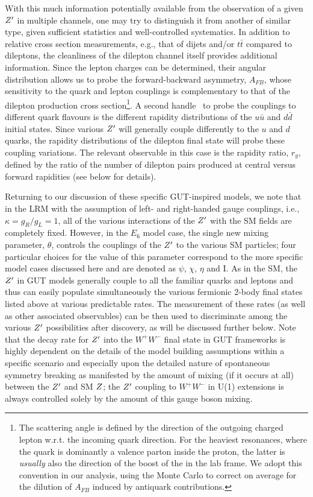 With this much information potentially available from the observation of a given $Z^{\prime}$ in multiple channels, one may try to distinguish it from another \Zp{} of similar type, given
sufficient statistics and
well-controlled systematics. In addition to relative cross section measurements,  e.g., that of dijets and/or $t\bar t$ compared to dileptons, the cleanliness of the dilepton channel itself
provides additional information.  Since the lepton charges can be determined, their angular distribution allows us to probe the forward-backward asymmetry, $A_{FB}$, whose sensitivity to the quark and lepton couplings is complementary to that of the dilepton production cross section\footnote{The scattering angle is defined by the direction of the outgoing charged lepton w.r.t. the incoming quark direction. For the heaviest resonances, where the quark is dominantly a valence parton inside the proton, the latter is {\it usually} also the direction of the boost of the \Zp{} in the lab frame. We adopt this convention in our analysis, using the Monte Carlo to correct on average for the dilution of $A_{FB}$ induced by antiquark contributions.}. A second handle~\cite{delAguila:1993ym} to probe the couplings to different quark flavours is the different rapidity distributions of the $u\bar u$ and $d\bar d$ initial states. Since various $Z^{\prime}$ will generally couple differently to the  $u$ and $d$ quarks, the
rapidity distributions of the dilepton final state will probe these coupling variations. The relevant observable in this case is the rapidity ratio, $r_y$, defined by the ratio of the number of
dilepton pairs produced at central versus forward  rapidities (see below for details).

Returning to our discussion of these specific GUT-inspired models, we note that in the LRM with the assumption of left- and right-handed gauge couplings, i.e., $\kappa=g_R/g_L=1$,
all of the various interactions of the $Z^{\prime}$ with the SM fields are completely fixed. However, in the $E_6$ model case, the
single new mixing parameter, $\theta$, controls the couplings of the $Z^{\prime}$ to the various SM particles; four particular choices for the value of this parameter correspond to the more
specific model cases discussed here and are denoted as $\psi$, $\chi$, $\eta$ and I. As in the SM, the $Z^{\prime}$ in GUT models generally couple to all the familiar quarks and leptons and
thus can easily populate simultaneously the various fermionic 2-body final states listed above at various predictable rates. The measurement of these rates (as well as other associated
observables) can be then used to discriminate among the various $Z^{\prime}$ possibilities after discovery, as will be discussed further below. Note that the decay rate for $Z^{\prime}$ into the
$W^+W^-$ final state in GUT frameworks is highly dependent on the details of the model building assumptions within a specific scenario and especially upon the detailed nature
of spontaneous symmetry breaking as manifested by the amount of mixing (if it occurs at all) between the $Z^{\prime}$ and SM $Z$; the $Z^{\prime}$ coupling to $W^+W^-$ in U(1) extensions is
always controlled solely by the amount of this gauge boson mixing.

